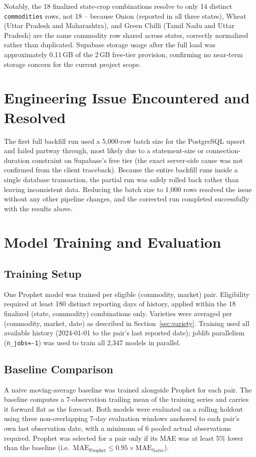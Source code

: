 Notably, the 18 finalized state-crop combinations resolve to only 14
distinct \texttt{commodities} rows, not 18 -- because Onion (reported in
all three states), Wheat (Uttar Pradesh and Maharashtra), and Green
Chilli (Tamil Nadu and Uttar Pradesh) are the same commodity row shared
across states, correctly normalized rather than duplicated. Supabase
storage usage after the full load was approximately 0.11\,GB of the
2\,GB free-tier provision, confirming no near-term storage concern for
the current project scope.

\section{Engineering Issue Encountered and Resolved}
The first full backfill run used a 5{,}000-row batch size for the
PostgreSQL upsert and failed partway through, most likely due to a
statement-size or connection-duration constraint on Supabase's free
tier (the exact server-side cause was not confirmed from the client
traceback). Because the entire backfill runs inside a single database
transaction, the partial run was safely rolled back rather than leaving
inconsistent data. Reducing the batch size to 1{,}000 rows resolved the
issue without any other pipeline changes, and the corrected run
completed successfully with the results above.

\section{Model Training and Evaluation}

\subsection{Training Setup}
One Prophet model was trained per eligible (commodity, market) pair.
Eligibility required at least 180 distinct reporting days of history,
applied within the 18 finalized (state, commodity) combinations only.
Varieties were averaged per (commodity, market, date) as described in
Section~\ref{sec:variety}. Training used all available history
(2024-01-01 to the pair's last reported date); joblib parallelism
(\texttt{n\_jobs=-1}) was used to train all 2{,}347 models in parallel.

\subsection{Baseline Comparison}
A naive moving-average baseline was trained alongside Prophet for each
pair. The baseline computes a 7-observation trailing mean of the training
series and carries it forward flat as the forecast. Both models were
evaluated on a rolling holdout using three non-overlapping 7-day
evaluation windows anchored to each pair's own last observation date,
with a minimum of 6 pooled actual observations required. Prophet was
selected for a pair only if its MAE was at least 5\% lower than the
baseline (i.e.\ $\text{MAE}_\text{Prophet} \leq 0.95 \times
\text{MAE}_\text{Naive}$).

